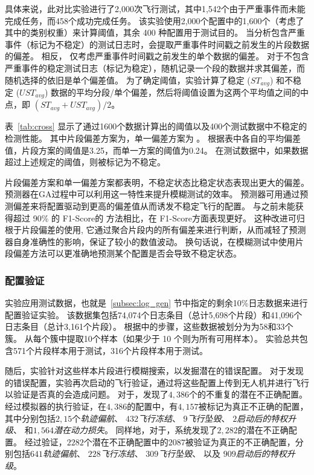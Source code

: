 具体来说，此对比实验进行了2,000次飞行测试，其中1,542个由于严重事件而未能完成任务，而458个成功完成任务。
该实验使用2,000个配置中的1,600个（考虑了其中的类别权重）来计算阈值，其余 400 种配置用于测试目的。
当分析包含严重事件（标记为不稳定）的测试日志时，\icsearcher 会提取严重事件时间戳之前发生的片段数据的偏差。
相反， 仅考虑严重事件时间戳之前发生的单个数据的偏差。
对于不包含严重事件的稳定测试日志（标记为稳定），\icsearcher 随机记录一个段的数据并求其偏差，而  随机选择的依旧是单个偏差值。
为了确定阈值，实验计算了稳定 ($ST_{avg}$) 和不稳定 ($UST_{avg}$) 数据的平均分段/单个偏差，然后将阈值设置为这两个平均值之间的中点，即 $(ST_{avg} + UST_{avg}) / 2$。


表~\ref{tab:cross} 显示了通过1600个数据计算出的阈值以及400个测试数据中不稳定的检测性能。
其中片段偏差方案为\icsearcher ，单一偏差方案为 。
根据表中各自的平均偏差值，片段方案的阈值是3.25，而单一方案的阈值为0.24。
在测试数据中，如果数据超过上述规定的阈值，则被标记为不稳定。

片段偏差方案和单一偏差方案都表明，不稳定状态比稳定状态表现出更大的偏差。
预测器在GA过程中可以利用这一特性来提升模糊测试的效率。
预测器可用通过预测偏差来将配置驱动到更高的偏差值从而诱发不稳定飞行的配置。
与之前未能获得超过 90\% 的 F1-Score的  方法相比，\icsearcher 在 F1-Score方面表现更好。
这种改进可归根于片段偏差的使用, 它通过聚合片段内的所有偏差来进行判断，从而减轻了预测器自身准确性的影响，保证了较小的数值波动。
换句话说，在模糊测试中使用片段偏差方法可以更准确地预测某个配置是否会导致不稳定状态。



\subsubsection{配置验证}
实验应用测试数据，也就是~\ref{subsec:log_gen} 节中指定的剩余10\%日志数据来进行配置验证实验。
该数据集包括74,074个日志条目（总计5,698个片段）和41,096个日志条目（总计3,161个片段）。
根据\icsearcher 中的步骤，这些数据被划分为为58和33个簇。
\icsearcher 从每个簇中提取10个样本（如果少于 10 个则为所有可用样本）。
实验总共包含571个片段样本用于测试，316个片段样本用于测试。

随后，实验针对这些样本片段进行模糊搜索，以发掘潜在的错误配置。
对于发现的错误配置，实验再次启动的飞行验证，通过将这些配置上传到无人机并进行飞行以验证是否真的会造成问题。
对于，\icsearcher 发现了$4,386$个的不重复的潜在不正确配置。
经过模拟器的执行验证，在$4,386$的配置中，有$4,157$被标记为真正不正确的配置，其中分别包括$2,15$个\emph{轨迹偏航}、
$432$\emph{飞行冻结}、
$9$\emph{飞行坠毁}、
$2$\emph{启动后的特权升级}、
和$1,564$\emph{潜在动力损失}。
同样地，对于，系统发现了$2,282$的潜在不正确配置。
经过验证，$2282$个潜在不正确配置中的$2087$被验证为真正的不正确配置，分别包括$641$\emph{轨迹偏航}、
$228$\emph{飞行冻结}、
$309$\emph{飞行坠毁}、 以及
$909$\emph{启动后的特权升级}。

